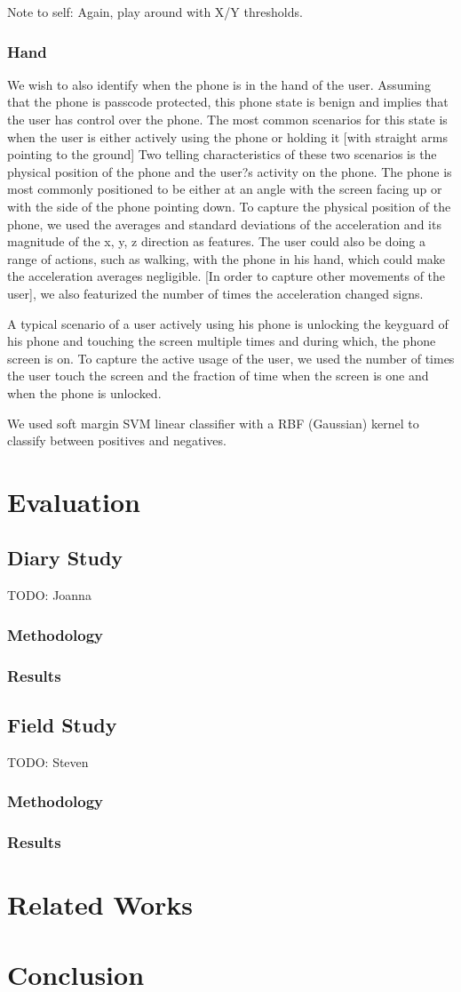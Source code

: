 \documentclass{article}
\begin{document}
Note to self: Again, play around with X/Y thresholds. 

\subsubsection{Hand}
We wish to also identify when the phone is in the hand of the user.
 Assuming that the phone is passcode protected, this phone state is benign and implies that the user has control over the phone. 
The most common scenarios for this state is when the user is either actively using the phone or holding it [with straight arms pointing to the ground]
 Two telling characteristics of these two scenarios is the physical position of the phone and the user?s activity on the phone. 
The phone is most commonly positioned to be either at an angle with the screen facing up or with the side of the phone pointing down. 
To capture the physical position of the phone, we used the averages and standard deviations of the  acceleration and its magnitude of the x, y, z direction as features. 
The user could also be doing a range of actions, such as walking, with the phone in his hand, which could make the acceleration averages negligible. 
[In order to capture other movements of the user], we also featurized the number of times the acceleration changed signs. 

A typical scenario of a user actively using his phone is unlocking the keyguard of his phone and touching the screen multiple times and during which, the phone screen is on. 
To capture the active usage of the user, we used the number of times the user touch the screen and the fraction of time when the screen is one and when the phone is unlocked. 

We used soft margin SVM linear classifier with a RBF (Gaussian) kernel to classify between positives and negatives. 
\section{Evaluation}
\subsection{Diary Study}
TODO: Joanna
\subsubsection{Methodology}
\subsubsection{Results}

\subsection{Field Study}
TODO: Steven
\subsubsection{Methodology}
\subsubsection{Results}

\section{Related Works}
\section{Conclusion}
\end{document}
